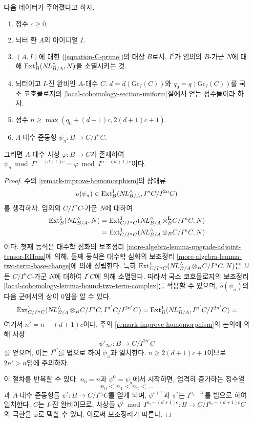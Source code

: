 \begin{lemma}
\label{lemma-get-morphism-general-better}
다음 데이터가 주어졌다고 하자.
\begin{enumerate}
\item 정수 $c \geq 0$.
\item 뇌터 환 $A$의 아이디얼 $I$.
\item $(A, I)$에 대한 (\ref{equation-C-prime})의 대상 $B$로서,
$I^c$가 임의의 $B$-가군 $N$에 대해 $\mathop{\mathrm{Ext}}\nolimits^1_B(\mathop{N\!L}\nolimits_{B/A}^\wedge, N)$을 소멸시키는 것.
\item 뇌터이고 $I$-진 완비인 $A$-대수 $C$.
$d = d(\text{Gr}_I(C))$와 $q_0 = q(\text{Gr}_I(C))$를
국소 코호몰로지의 \ref{local-cohomology-section-uniform}절에서 얻는 정수들이라 하자.
\item 정수 $n \geq \max(q_0 + (d + 1)c, 2(d + 1)c + 1)$.
\item $A$-대수 준동형 $\psi_n : B \to C/I^nC$.
\end{enumerate}
그러면 $A$-대수 사상 $\varphi : B \to C$가 존재하여
$\psi_n \bmod I^{n - (d + 1)c} = \varphi \bmod I^{n - (d + 1)c}$이다.
\end{lemma}

\begin{proof}
주의 \ref{remark-improve-homomorphism}의 장애류
$$
o(\psi_n) \in \mathop{\mathrm{Ext}}\nolimits^1_B(\mathop{N\!L}\nolimits_{B/A}^\wedge, I^nC/I^{2n}C)
$$
를 생각하자. 임의의 $C/I^nC$-가군 $N$에 대하여
\begin{align*}
\mathop{\mathrm{Ext}}\nolimits^1_B(\mathop{N\!L}\nolimits_{B/A}^\wedge, N)
& =
\mathop{\mathrm{Ext}}\nolimits^1_{C/I^nC}(\mathop{N\!L}\nolimits_{B/A}^\wedge \otimes_B^\mathbf{L} C/I^nC, N) \\
& =
\mathop{\mathrm{Ext}}\nolimits^1_{C/I^nC}(\mathop{N\!L}\nolimits_{B/A}^\wedge \otimes_B C/I^nC, N)
\end{align*}
이다. 첫째 등식은 대수학 심화의 보조정리
\ref{more-algebra-lemma-upgrade-adjoint-tensor-RHom}에 의해,
둘째 등식은 대수학 심화의 보조정리
\ref{more-algebra-lemma-two-term-base-change}에 의해 성립한다.
특히 $\mathop{\mathrm{Ext}}\nolimits^1_{C/I^nC}(\mathop{N\!L}\nolimits_{B/A}^\wedge \otimes_B C/I^nC, N)$은
모든 $C/I^nC$-가군 $N$에 대하여 $I^cC$에 의해 소멸된다.
따라서 국소 코호몰로지의 보조정리
\ref{local-cohomology-lemma-bound-two-term-complex}를 적용할 수 있으며,
$o(\psi_n)$의 다음 군에서의 상이 0임을 알 수 있다.
$$
\mathop{\mathrm{Ext}}\nolimits^1_{C/I^nC}(\mathop{N\!L}\nolimits_{B/A}^\wedge \otimes_B C/I^nC, I^{n'}C/I^{2n'}C) =
\mathop{\mathrm{Ext}}\nolimits^1_B(\mathop{N\!L}\nolimits_{B/A}^\wedge, I^{n'}C/I^{2n'}C) =
$$
여기서 $n' = n - (d + 1)c$이다.
주의 \ref{remark-improve-homomorphism}의 논의에 의해 사상
$$
\psi'_{2n'} : B \to C/I^{2n'}C
$$
를 얻으며, 이는 $I^{n'}$를 법으로 하여 $\psi_n$과 일치한다.
$n \geq 2(d + 1)c + 1$이므로 $2n' > n$임에 주의하자.

\medskip\noindent
이 절차를 반복할 수 있다. $n_0 = n$과 $\psi^0 = \psi_n$에서 시작하면,
엄격히 증가하는 정수열
$$
n_0 < n_1 < n_2 < \ldots
$$
과 $A$-대수 준동형들 $\psi^i : B \to C/I^{n_i}C$를 얻게 되며,
$\psi^{i + 1}$과 $\psi^i$는 $I^{n_i - tc}$를 법으로 하여 일치한다.
$C$는 $I$-진 완비이므로, 사상들
$\psi^i \bmod I^{n_i - (d + 1)c} : B \to C/I^{n_i - (d + 1)c}C$의 극한을
$\varphi$로 택할 수 있다. 이로써 보조정리가 따른다.
\end{proof}

